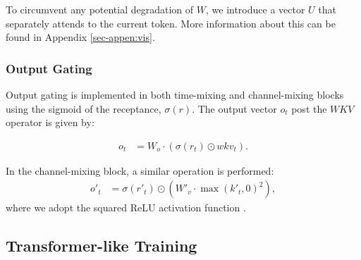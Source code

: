 \documentclass[11pt]{article}
\begin{document}
To circumvent any potential degradation of $W$, we introduce a vector $U$ that separately attends to the current token. More information about this can be found in Appendix \ref{sec-appen:vis}.

\subsubsection{Output Gating}

Output gating is implemented in both time-mixing and channel-mixing blocks using the sigmoid of the receptance, $\sigma(r)$. The output vector $o_t$ post the $WKV$ operator is given by:

\begin{align}
\label{eq:time-mix4}
o_t &= W_o \cdot (\sigma(r_t) \odot wkv_t).
\end{align}

In the channel-mixing block, a similar operation is performed:
\begin{align}
\label{eq:channel_mix_eqs3}
o'_t &= \sigma(r'_t) \odot (W'_v \cdot \max({k'_t}, 0)^2),
\end{align}
where we adopt the squared ReLU activation function \cite{DBLP:journals/corr/abs-2109-08668}.


\subsection{Transformer-like Training} \label{transformer_parallel}
\end{document}
